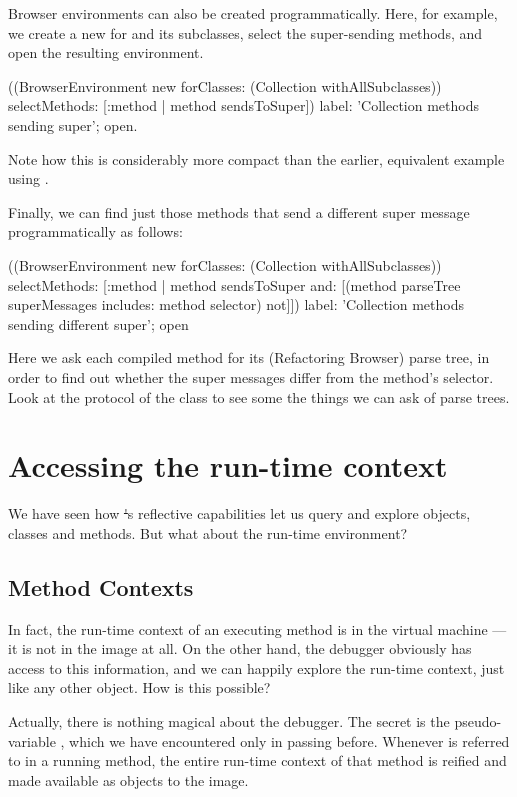\documentclass[a4paper,10pt,twoside]{book}
\begin{document}
Browser environments can also be created programmatically.
Here, for example, we create a new  for  and its subclasses, select the super-sending methods, and open the resulting environment.
\begin{code}{}
((BrowserEnvironment new forClasses: (Collection withAllSubclasses))
	selectMethods: [:method | method sendsToSuper])
	label: 'Collection methods sending super';
	open.
\end{code}{}

Note how this is considerably more compact than the earlier, equivalent example using .

Finally, we can find just those methods that send a different super message programmatically as follows:
\begin{code}{}
((BrowserEnvironment new forClasses: (Collection withAllSubclasses))
	selectMethods: [:method | 
		method sendsToSuper
		and: [(method parseTree superMessages includes: method selector) not]])
	label: 'Collection methods sending different super';
	open
\end{code}
Here we ask each compiled method for its (Refactoring Browser) parse tree, in order to find out whether the super messages differ from the method's selector.
Look at the  protocol of the class  to see some the things we can ask of parse trees.

\section{Accessing the run-time context}

We have seen how \st's reflective capabilities let us query and explore objects, classes and methods.  But what about the run-time environment?

\subsection{Method Contexts}

In fact, the run-time context of an executing method is in the virtual machine --- it is not in the image at all.
On the other hand, the debugger obviously has access to this information, and we can happily explore the run-time context, just like any other object.
How is this possible?

Actually, there is nothing magical about the debugger.
The secret is the pseudo-variable , which we have encountered only in passing before.
Whenever  is referred to in a running method, the entire run-time context of that method is reified and made available as  objects to the image.
\end{document}
